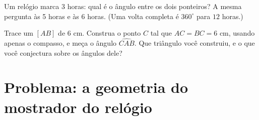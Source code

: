 \begin{exercise}[$\star\star$]\label{exo:g6:lines:11}
Um relógio marca 3 horas: qual é o ângulo entre os dois ponteiros? A
mesma pergunta às 5 horas e às 6 horas. (Uma volta completa é
$360^\circ$ para $12$ horas.)
\end{exercise}

\begin{exercise}[$\star\star\star$]\label{exo:g6:lines:12}
Trace um  $[AB]$ de $6$ cm. Construa o ponto $C$ tal que
$AC = BC = 6$ cm, usando apenas o compasso, e meça o ângulo
$\widehat{CAB}$. Que triângulo você construiu, e o que você conjectura
sobre os ângulos dele?
\end{exercise}

\section{Problema: a geometria do mostrador do relógio}

